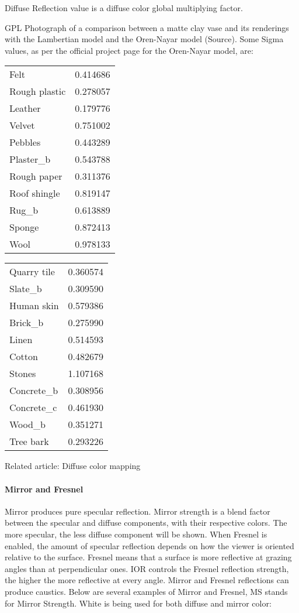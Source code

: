 Diffuse Reflection value is a diffuse color global multiplying factor.


GPL Photograph of a comparison between a matte clay vase and its renderings with the Lambertian model and the Oren-Nayar model (Source). Some Sigma values, as per the official project page for the Oren-Nayar model, are:

\begin{multicols}{2}
\begin{tabular}{l l}
Felt& 0.414686\\
Rough plastic& 0.278057\\
Leather& 0.179776\\
Velvet& 0.751002\\
Pebbles& 0.443289\\
Plaster\_b& 0.543788\\
Rough paper& 0.311376\\
Roof shingle& 0.819147\\
Rug\_b& 0.613889\\
Sponge& 0.872413\\
Wool& 0.978133\\
\end{tabular}
\begin{tabular}{l l}
Quarry tile& 0.360574\\
Slate\_b& 0.309590\\
Human skin& 0.579386\\
Brick\_b& 0.275990\\
Linen& 0.514593\\
Cotton& 0.482679\\
Stones& 1.107168\\
Concrete\_b& 0.308956\\
Concrete\_c& 0.461930\\
Wood\_b& 0.351271\\
Tree bark& 0.293226\\
\end{tabular}
\end{multicols}

Related article: Diffuse color mapping
\paragraph{Mirror and Fresnel}

Mirror produces pure specular reflection. Mirror strength is a blend factor between the specular and diffuse components, with their respective colors. The more specular, the less diffuse component will be shown. When Fresnel is enabled, the amount of specular reflection depends on how the viewer is oriented relative to the surface. Fresnel means that a surface is more reflective at grazing angles than at perpendicular ones. IOR controls the Fresnel reflection strength, the higher the more reflective at every angle. Mirror and Fresnel reflections can produce caustics. Below are several examples of Mirror and Fresnel, MS stands for Mirror Strength. White is being used for both diffuse and mirror color:

